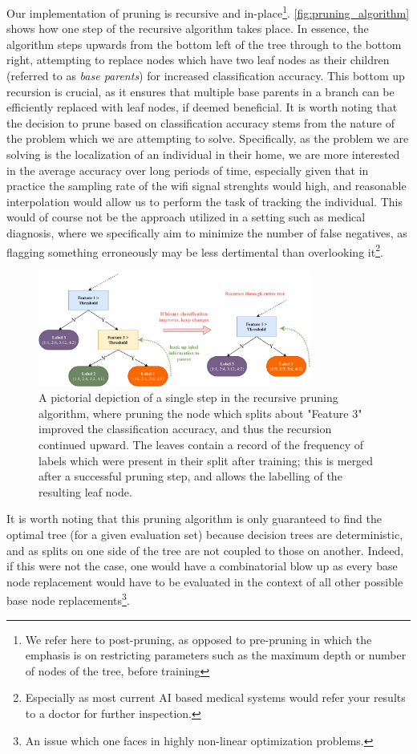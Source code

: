 \documentclass[11pt,twoside]{article}
\begin{document}
Our implementation of pruning is recursive and in-place\footnote{%
We refer here to post-pruning, as opposed to pre-pruning in which the emphasis is on restricting parameters such as the maximum depth or number of nodes of the tree, before training}.
\autoref{fig:pruning_algorithm} shows how one step of the recursive algorithm takes place. In essence, the algorithm steps upwards from the bottom left of the tree through to the bottom right, attempting to replace nodes which have two leaf nodes as their children (referred to as \textit{base parents}) for increased classification accuracy. This bottom up recursion is crucial, as it ensures that multiple base parents in a branch can be efficiently replaced with leaf nodes, if deemed beneficial. It is worth noting that the decision to prune based on classification accuracy stems from the nature of the problem which we are attempting to solve. Specifically, as the problem we are solving is the localization of an individual in their home, we are more interested in the average accuracy over long periods of time, especially given that in practice the sampling rate of the wifi signal strenghts would high, and reasonable interpolation would allow us to perform the task of tracking the individual. This would of course not be the approach utilized in a setting such as medical diagnosis, where we specifically aim to minimize the number of false negatives, as flagging something erroneously may be less dertimental than overlooking it\footnote{Especially as most current AI based medical systems would refer your results to a doctor for further inspection.}.
\begin{figure}[H]
    \centering
    \includegraphics[width=0.8\textwidth]{figures/pruning.pdf}
    \caption[Illustration of Recursive Pruning Algorithm]{A pictorial depiction of a single step in the recursive pruning algorithm, where pruning the node which splits about "Feature 3" improved the classification accuracy, and thus the recursion continued upward. The leaves contain a record of the frequency of labels which were present in their split after training; this is merged after a successful pruning step, and allows the labelling of the resulting leaf node.}
    \label{fig:pruning_algorithm}
\end{figure}
It is worth noting that this pruning algorithm is only guaranteed to find the optimal tree (for a given evaluation set) because decision trees are deterministic, and as splits on one side of the tree are not coupled to those on another. Indeed, if this were not the case, one would have a combinatorial blow up as every base node replacement would have to be evaluated in the context of all other possible base node replacements\footnote{An issue which one faces in highly non-linear optimization problems.}.
\end{document}
